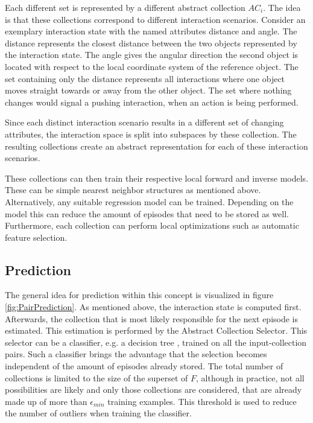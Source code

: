 Each different set is represented by a different abstract collection $AC_i$. The 
idea is that these collections correspond to different interaction scenarios.
Consider an exemplary interaction state with the named attributes distance and angle.
The distance represents the closest distance between the two objects represented by the interaction state. The angle gives the angular direction the second object is located with respect to the local coordinate system of the reference object. The set containing only the distance represents all interactions where one object moves straight towards or away from the other object. The set where nothing changes would signal a pushing interaction, when an action is being performed.

Since each distinct interaction scenario results in a different set of changing attributes, the interaction space is split into subspaces by these collection. The resulting collections create an abstract representation for each of these interaction scenarios.

These collections can then train their respective local forward and inverse models. These can be simple nearest neighbor structures as mentioned above. Alternatively, any suitable regression model can be trained. Depending on the model this can reduce the amount of episodes that need to be stored as well. Furthermore, each collection can perform local optimizations such as automatic feature selection.

\subsection{Prediction}
The general idea for prediction within this concept is visualized in figure \ref{fig:PairPrediction}. As mentioned above, the interaction state is computed first.
Afterwards, the collection that is most likely 
responsible for the next episode is estimated. This estimation is performed by the Abstract Collection Selector. This selector can be a classifier, e.g. a decision tree \cite{DT}, trained on all the input-collection pairs. Such a classifier brings the advantage that the selection becomes 
independent of the amount of episodes already stored. The total number 
of collections is limited to the size of the superset of $F$, although in 
practice, not all possibilities are likely and only those collections are 
considered, that are already made up of more than $\epsilon_{min}$ training 
examples. This threshold is used to reduce the number of outliers when training the 
classifier.  

